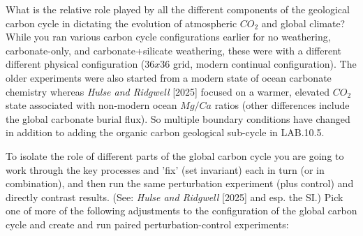 What is the relative role played by all the different components of the geological carbon cycle in dictating the evolution of atmospheric $CO_{2}$ and global climate? While you ran various carbon cycle configurations earlier for no weathering, carbonate-only, and carbonate+silicate weathering, these were with a different different physical configuration ($36x36$ grid, modern continual configuration). The older experiments were also started from a modern state of ocean carbonate chemistry whereas \textit{Hulse and Ridgwell} [2025] focused on a warmer, elevated $CO_{2}$ state associated with non-modern ocean $Mg/Ca$ ratios (other differences include the global carbonate burial flux). So multiple boundary conditions have changed in addition to adding the organic carbon geological sub-cycle in \textsf{\footnotesize LAB.10.5}.

\vspace{1mm}
To isolate the role of different parts of the global carbon cycle you are going to work through the key processes and 'fix' (set invariant) each in turn (or in combination), and then run the same perturbation experiment (plus control) and directly contrast results. (See: \textit{Hulse and Ridgwell} [2025] and esp. the SI.) Pick one of more of the following adjustments to the configuration of the global carbon cycle and create and run paired perturbation-control experiments:

